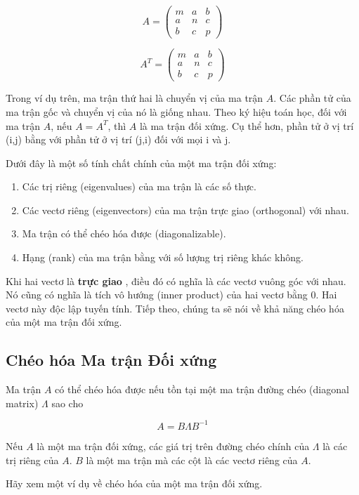 \[A= \begin{pmatrix} m & a & b \\ a & n & c \\ b & c & p \end{pmatrix}\]

\[A^{T}= \begin{pmatrix} m & a & b \\ a & n & c \\ b & c & p \end{pmatrix}\]

Trong ví dụ trên, ma trận thứ hai là chuyển vị của ma trận $A$. Các phần tử của ma trận gốc và chuyển vị của nó là giống nhau. Theo ký hiệu toán học, đối với ma trận $A$, nếu $A = A^{T}$, thì $A$ là ma trận đối xứng. Cụ thể hơn, phần tử ở vị trí (i,j) bằng với phần tử ở vị trí (j,i) đối với mọi i và j.

Dưới đây là một số tính chất chính của một ma trận đối xứng:

\begin{enumerate}
  \item Các trị riêng (eigenvalues) của ma trận là các số thực.
  \item Các vectơ riêng (eigenvectors) của ma trận trực giao (orthogonal) với nhau.
  \item Ma trận có thể chéo hóa được (diagonalizable).
  \item Hạng (rank) của ma trận bằng với số lượng trị riêng khác không.
\end{enumerate}
Khi hai vectơ là \textbf{trực giao} , điều đó có nghĩa là các vectơ vuông góc với nhau. Nó cũng có nghĩa là tích vô hướng (inner product) của hai vectơ bằng 0. Hai vectơ này độc lập tuyến tính. Tiếp theo, chúng ta sẽ nói về khả năng chéo hóa của một ma trận đối xứng.

\subsection{Chéo hóa Ma trận Đối xứng}

Ma trận $A$ có thể chéo hóa được nếu tồn tại một ma trận đường chéo (diagonal matrix) $\Lambda$ sao cho

\[A = B \Lambda B^{-1}\]

Nếu $A$ là một ma trận đối xứng, các giá trị trên đường chéo chính của $\Lambda$ là các trị riêng của $A$. $B$ là một ma trận mà các cột là các vectơ riêng của $A$.

Hãy xem một ví dụ về chéo hóa của một ma trận đối xứng.

